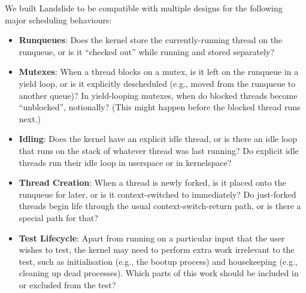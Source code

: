 
We built Landslide to be compatible with multiple designs for the following major scheduling behaviours:

\begin{itemize}
	\item {\bf Runqueues}: Does the kernel store the currently-running thread on the runqueue, or is it ``checked out'' while running and stored separately?
	\item {\bf Mutexes}: When a thread blocks on a mutex, is it left on the runqueue in a yield loop, or is it explicitly descheduled (e.g., moved from the runqueue to another queue)? In yield-looping mutexes, when do blocked threads become ``unblocked'', notionally? (This might happen before the blocked thread runs next.)
	\item {\bf Idling}: Does the kernel have an explicit idle thread, or is there an idle loop that runs on the stack of whatever thread was last running? Do explicit idle threads run their idle loop in userspace or in kernelspace?
	\item {\bf Thread Creation}: When a thread is newly forked, is it placed onto the runqueue for later, or is it context-switched to immediately? Do just-forked threads begin life through the usual context-switch-return path, or is there a special path for that?
	\item {\bf Test Lifecycle}: Apart from running on a particular input that the user wishes to test, the kernel may need to perform extra work irrelevant to the test, such as initialisation (e.g., the bootup process) and housekeeping (e.g., cleaning up dead processes). Which parts of this work should be included in or excluded from the test?
\end{itemize}
